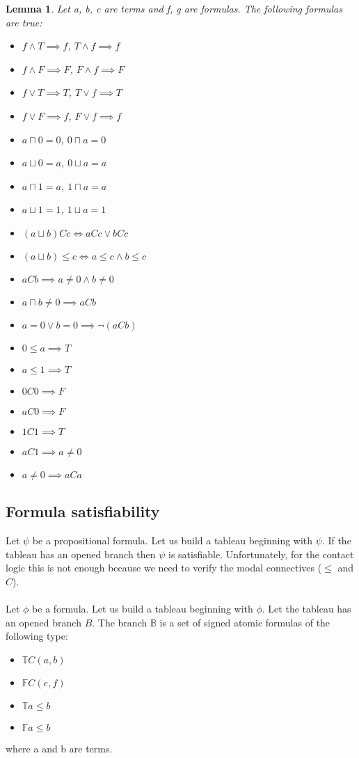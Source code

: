 \documentclass{article}
\newcommand\ST{\mathbb{T}}
\newcommand\SF{\mathbb{F}}
\newcommand\SB{\mathbb{B}}
\newtheorem{lemma}[theorem]{Lemma}
\begin{document}
	\begin{lemma}
		Let a, b, c are terms and f, g are formulas. The following formulas are true:
		\begin{itemize}
			\item $f \land T \implies f$, $T \land f \implies f$
			\item $f \land F \implies F$, $F \land f \implies F$
			\item $f \lor T \implies T$, $T \lor f \implies T$
			\item $f \lor F \implies f$, $F \lor f \implies f$
			\item $a \sqcap 0 = 0$, $0 \sqcap a = 0$
			\item $a \sqcup 0 = a$, $0 \sqcup a = a$
			\item $a \sqcap 1 = a$, $1 \sqcap a = a$
			\item $a \sqcup 1 = 1$, $1 \sqcup a = 1$
			\item $(a \sqcup b)Cc \iff aCc \lor bCc$
			\item $(a \sqcup b) \leq c \iff a \leq c \land b \leq c$
			\item $aCb \implies a \neq 0 \land b \neq 0$
			\item $a \sqcap b \neq 0 \implies aCb$
			\item $a = 0 \lor b = 0 \implies \neg(aCb)$
			\item $0 \leq a \implies T$
			\item $a \leq 1 \implies T$
			\item $0C0 \implies F$
			\item $aC0 \implies F$
			\item $1C1 \implies T$
			\item $aC1 \implies a \neq 0$
			\item $a \neq 0 \implies aCa$
		\end{itemize}
	\end{lemma}

	\subsection{Formula satisfiability}
		Let $\psi$ be a propositional formula. Let us build a tableau beginning with $\psi$. If the tableau has an opened branch then $\psi$ is satisfiable. Unfortunately, for the contact logic this is not enough because we need to verify the modal connectives ($\leq$ and $C$).
		\paragraph{}
		Let $\phi$ be a formula. Let us build a tableau beginning with $\phi$. Let the tableau has an opened branch $B$. The branch $\SB$ is a set of signed atomic formulas of the following type:
		\begin{itemize}
			\item $\ST C(a,b)$
			\item $\SF C(e,f)$
			\item $\ST a \leq b$
			\item $\SF a \leq b$
		\end{itemize}
		where a and b are terms.
\end{document}
